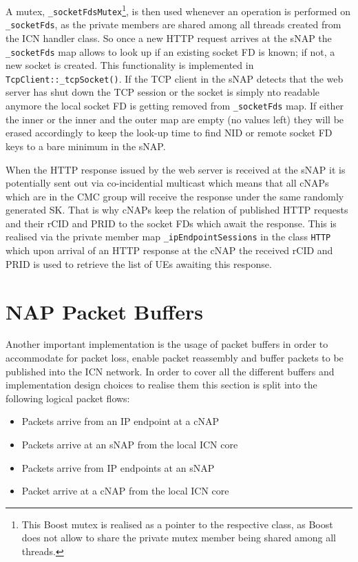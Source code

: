 \documentclass[a4paper,11pt,titlepage]{report}
\begin{document}
A mutex, \texttt{\_socketFdsMutex}\footnote{This Boost mutex is realised as a pointer to the respective class, as Boost does not allow to share the private mutex member being shared among all threads.}, is then used whenever an operation is performed on \texttt{\_socketFds}, as the private members are shared among all threads created from the ICN handler class. So once a new HTTP request arrives at the \ac{sNAP} the \texttt{\_socketFds} map allows to look up if an existing socket \ac{FD} is known; if not, a new socket is created. This functionality is implemented in \texttt{TcpClient::\_tcpSocket()}. If the \ac{TCP} client in the \ac{sNAP} detects that the web server has shut down the \ac{TCP} session or the socket is simply nto readable anymore the local socket \ac{FD} is getting removed from \texttt{\_socketFds} map. If either the inner or the inner and the outer map are empty (no values left) they will be erased accordingly to keep the look-up time to find \ac{NID} or remote socket \ac{FD} keys to a bare minimum in the \ac{sNAP}.

When the \ac{HTTP} response issued by the web server is received at the \ac{sNAP} it is potentially sent out via co-incidential multicast which means that all \acp{cNAP} which are in the \ac{CMC} group will receive the response under the same randomly generated \ac{SK}. That is why \acp{cNAP} keep the relation of published \ac{HTTP} requests and their \ac{rCID} and \ac{PRID} to the socket \acp{FD} which await the response. This is realised via the private member map \texttt{\_ipEndpointSessions} in the class \texttt{HTTP} which upon arrival of an \ac{HTTP} response at the \ac{cNAP} the received \ac{rCID} and \ac{PRID} is used to retrieve the list of \acp{UE} awaiting this response.

\section{\acl{NAP} Packet Buffers}
Another important implementation is the usage of packet buffers in order to accommodate for packet loss, enable packet reassembly and buffer packets to be published into the ICN network. In order to cover all the different buffers and implementation design choices to realise them this section is split into the following logical packet flows:

\begin{itemize}
	\item Packets arrive from an IP endpoint at a \ac{cNAP}
	\item Packets arrive at an \ac{sNAP} from the local \ac{ICN} core
	\item Packets arrive from IP endpoints at an \ac{sNAP}
	\item Packet arrive at a \ac{cNAP} from the local \ac{ICN} core
\end{itemize} 
\end{document}
